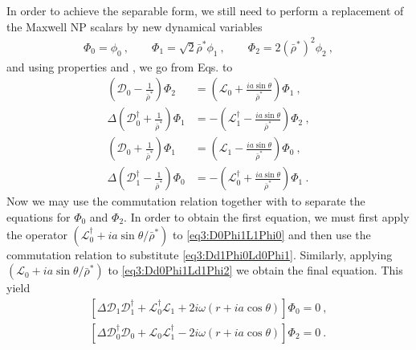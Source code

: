 In order to achieve the separable form, we still need to perform a replacement of the Maxwell NP scalars by new dynamical variables
\begin{align}
    \label{eq3:phiBarRhoToPhi}
    \Phi_0 = \phi_0 ~,\qquad \Phi_1 = \sqrt{2} \bar{\rho}^* \phi_1 ~,\qquad \Phi_2 = 2 (\bar{\rho}^*)^2 \phi_2  ~,
\end{align}
and using properties  and , we go from Eqs.  to
\begin{subequations}
    \label{eq3:AllDPhiLPhi}
    \begin{align}
        \label{eq3:D0Phi2L0Phi1}
        \left( \mathscr{D}_0 - \frac{1}{\bar{\rho}^*} \right) \Phi_2 &=
        \left( \mathscr{L}_0 + \frac{i a \sin\theta}{\bar{\rho}^*} \right) \Phi_1 ~, \\
        \label{eq3:Dd0Phi1Ld1Phi2}
        \Delta \left( \mathscr{D}^\dagger_0 + \frac{1}{\bar{\rho}^*} \right) \Phi_1 &= 
        -\left( \mathscr{L}^\dagger_1 - \frac{i a \sin\theta}{\bar{\rho}^*} \right) \Phi_2 ~, \\
        \label{eq3:D0Phi1L1Phi0}
        \left( \mathscr{D}_0 + \frac{1}{\bar{\rho}^*} \right) \Phi_1 &= 
        \left( \mathscr{L}_1 - \frac{i a \sin\theta}{\bar{\rho}^*} \right) \Phi_0 ~, \\
        \label{eq3:Dd1Phi0Ld0Phi1}
        \Delta \left( \mathscr{D}^\dagger_1 - \frac{1}{\bar{\rho}^*} \right) \Phi_0 &= 
        -\left( \mathscr{L}^\dagger_0 + \frac{i a \sin\theta}{\bar{\rho}^*} \right) \Phi_1 ~.
    \end{align}
\end{subequations}
Now we may use the commutation relation  together with  to separate the equations for $\Phi_0$ and $\Phi_2$.
In order to obtain the first equation, we must first apply the operator $(\mathscr{L}^\dagger_0 + i a \sin\theta/\bar{\rho}^*)$ to \eqref{eq3:D0Phi1L1Phi0} and then use the commutation relation to substitute \eqref{eq3:Dd1Phi0Ld0Phi1}.
Similarly, applying $(\mathscr{L}_0 + i a \sin\theta/\bar{\rho}^*)$ to \eqref{eq3:Dd0Phi1Ld1Phi2} we obtain the final equation.
This yield
\begin{align}
    \label{eq3:DDLLPhi0}
    \left[ \Delta \mathscr{D}_1 \mathscr{D}^\dagger_1 + \mathscr{L}^\dagger_0 \mathscr{L}_1 + 2 i \omega (r+i a \cos\theta) \right] \Phi_0 = 0 ~, \\
    \label{eq3:DDLLPhi2}
    \left[ \Delta \mathscr{D}^\dagger_0 \mathscr{D}_0 + \mathscr{L}_0 \mathscr{L}^\dagger_1 - 2 i \omega (r+i a \cos\theta) \right] \Phi_2 = 0 ~.
\end{align}
